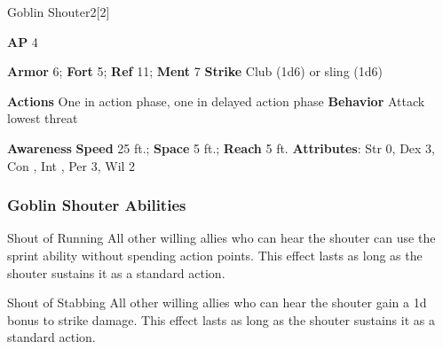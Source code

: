 \begin{monsection}{Goblin Shouter}{2}[2]
\vspace{-1em}\vspace{-1em}
\begin{spellcontent}
\begin{spelltargetinginfo}
{\textbf{AP} 4}

\pari \textbf{Armor} 6;
\textbf{Fort} 5;
\textbf{Ref} 11;
\textbf{Ment} 7
\pari \textbf{Strike} Club  (1d6) or sling  (1d6)


\pari \textbf{Actions} One in action phase, one in delayed action phase
\pari \textbf{Behavior} Attack lowest threat
\end{spelltargetinginfo}
\end{spellcontent}

\begin{monsterfooter}
\pari \textbf{Awareness} 
\pari \textbf{Speed} 25 ft.;
\textbf{Space} 5 ft.;
\textbf{Reach} 5 ft.
\pari \textbf{Attributes}:
Str 0,
Dex 3,
Con ,
Int ,
Per 3,
Wil 2
\end{monsterfooter}
\end{monsection}


\subsubsection{Goblin Shouter Abilities}

\begin{ability}{Shout of Running}
All other willing allies who can hear the shouter can use the sprint ability without spending action points.
This effect lasts as long as the shouter sustains it as a standard action.
\end{ability}

\vspace{0.5em}
\begin{ability}{Shout of Stabbing}
All other willing allies who can hear the shouter gain a \plus1d bonus to strike damage.
This effect lasts as long as the shouter sustains it as a standard action.
\end{ability}






